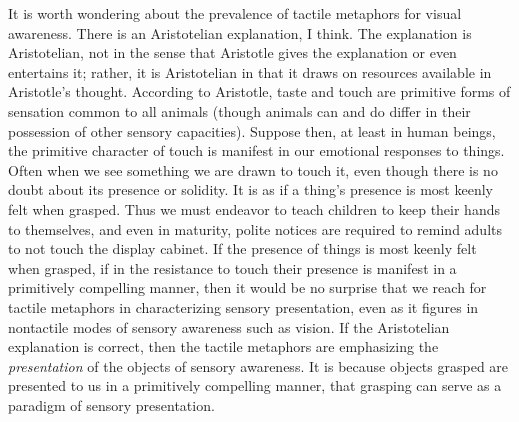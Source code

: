 It is worth wondering about the prevalence of tactile metaphors for visual awareness. There is an Aristotelian explanation, I think. The explanation is Aristotelian, not in the sense that Aristotle gives the explanation or even entertains it; rather, it is Aristotelian in that it draws on resources available in Aristotle's thought. According to Aristotle, taste and touch are primitive forms of sensation common to all animals (though animals can and do differ in their possession of other sensory capacities). Suppose then, at least in human beings, the primitive character of touch is manifest in our emotional responses to things. Often when we see something we are drawn to touch it, even though there is no doubt about its presence or solidity. It is as if a thing's presence is most keenly felt when grasped. Thus we must endeavor to teach children to keep their hands to themselves, and even in maturity, polite notices are required to remind adults to not touch the display cabinet. If the presence of things is most keenly felt when grasped, if in the resistance to touch their presence is manifest in a primitively compelling manner, then it would be no surprise that we reach for tactile metaphors in characterizing sensory presentation, even as it figures in nontactile modes of sensory awareness such as vision. If the Aristotelian explanation is correct, then the tactile metaphors are emphasizing the \emph{presentation} of the objects of sensory awareness. It is because objects grasped are presented to us in a primitively compelling manner, that grasping can serve as a paradigm of sensory presentation. 

